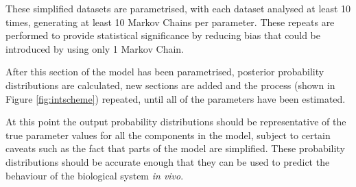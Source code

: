 These simplified datasets are parametrised, with each dataset analysed at least 10 times, generating at least 10 Markov Chains per parameter. These repeats are performed to provide statistical significance by reducing bias that could be introduced by using only 1 Markov Chain.

After this section of the model has been parametrised, posterior probability distributions are calculated, new sections are added and the process (shown in Figure \ref{fig:intscheme}) repeated, until all of the parameters have been estimated.

At this point the output probability distributions should be representative of the true parameter values for all the components in the model, subject to certain caveats such as the fact that parts of the model are simplified. These probability distributions should be accurate enough that they can be used to predict the behaviour of the biological system \textit{in vivo}.


